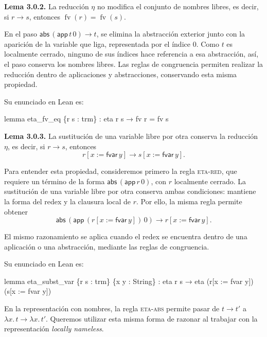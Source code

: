 \documentclass[
  spanish,
  letterpaper,
  DIV=11,
  numbers=noendperiod]{scrreprt}
\newenvironment{Shaded}{\begin{snugshade}}{\end{snugshade}}
\newcommand{\KeywordTok}[1]{\textcolor[rgb]{0.00,0.23,0.31}{\textbf{#1}}}
\newcommand{\NormalTok}[1]{\textcolor[rgb]{0.00,0.23,0.31}{#1}}
\renewcommand{\NormalTok}[1]{\textcolor[HTML]{000000}{#1}}
\renewcommand{\KeywordTok}[1]{\textcolor[HTML]{0000FF}{#1}}
\theoremstyle{remark}
\begin{document}
\textbf{Lema 3.0.2.} La reducción \(\eta\) no modifica el conjunto de
nombres libres, es decir, si \(r\longrightarrow s\), entonces
\(\operatorname{fv}(r)=\operatorname{fv}(s)\).

En el paso \(\mathsf{abs}\,(\mathsf{app}\,t\,0)\longrightarrow t\), se
elimina la abstracción exterior junto con la aparición de la variable
que liga, representada por el índice \(0\). Como \(t\) es localmente
cerrado, ninguno de sus índices hace referencia a esa abstracción, así,
el paso conserva los nombres libres. Las reglas de congruencia permiten
realizar la reducción dentro de aplicaciones y abstracciones,
conservando esta misma propiedad.

Su enunciado en Lean es:

\begin{Shaded}
\begin{Highlighting}[]
\KeywordTok{lemma}\NormalTok{ eta\_fv\_eq \{r s : trm\} :}
\NormalTok{    eta r s → fv r = fv s}
\end{Highlighting}
\end{Shaded}

\textbf{Lema 3.0.3.} La sustitución de una variable libre por otra
conserva la reducción \(\eta\), es decir, si \(r\longrightarrow s\),
entonces \[
r[x:=\mathsf{fvar}\,y]
\longrightarrow
s[x:=\mathsf{fvar}\,y].
\]

Para entender esta propiedad, consideremos primero la regla
\textsc{eta-red}, que requiere un término de la forma
\(\mathsf{abs}\,(\mathsf{app}\, r \,0)\), con \(r\) localmente cerrado.
La sustitución de una variable libre por otra conserva ambas
condiciones: mantiene la forma del redex y la clausura local de \(r\).
Por ello, la misma regla permite obtener \[
\mathsf{abs}\,
(\mathsf{app}\,(r[x:=\mathsf{fvar}\,y])\,0)
\longrightarrow
r[x:=\mathsf{fvar}\,y].
\]

El mismo razonamiento se aplica cuando el redex se encuentra dentro de
una aplicación o una abstracción, mediante las reglas de congruencia.

Su enunciado en Lean es:

\begin{Shaded}
\begin{Highlighting}[]
\KeywordTok{lemma}\NormalTok{ eta\_subst\_var \{r s : trm\} \{x y : String\} :}
\NormalTok{    eta r s →}
\NormalTok{    eta (r[x := fvar y]) (s[x := fvar y])}
\end{Highlighting}
\end{Shaded}

En la representación con nombres, la regla \textsc{eta-abs} permite
pasar de \(t \longrightarrow t'\) a
\(\lambda x.\, t \longrightarrow\lambda x.\, t'\). Queremos utilizar
esta misma forma de razonar al trabajar con la representación
\emph{locally nameless}.
\end{document}
